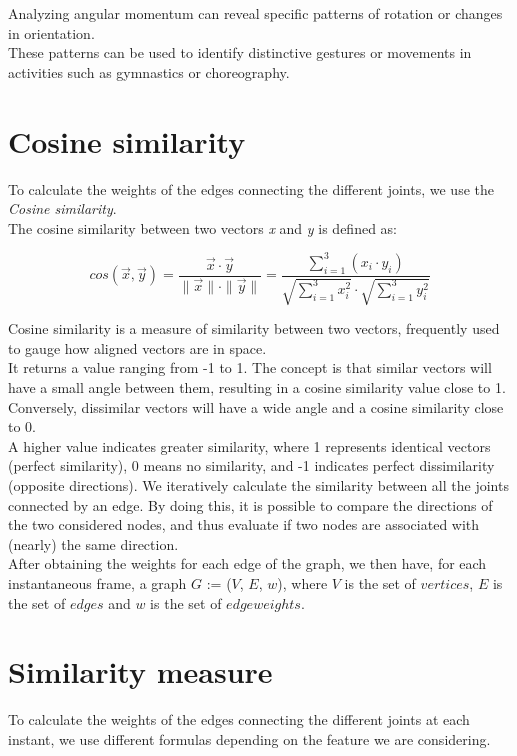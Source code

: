 Analyzing angular momentum can reveal specific patterns of rotation or changes in orientation. \\
These patterns can be used to identify distinctive gestures or movements in activities such as gymnastics or choreography.

\section{Cosine similarity} 
    
To calculate the weights of the edges connecting the different joints, we use the \textit{Cosine similarity}. \\ 
The cosine similarity between two vectors \textit{x} and \textit{y} is defined as: 

\begin{equation}  
  cos(\vec{x}, \vec{y}) = \frac{\vec{x} \cdot \vec{y}}{\|\vec{x}\| \cdot \|\vec{y}\|}  =  \frac{\sum_{i=1}^{3} (x_i \cdot y_i)}{\sqrt{\sum_{i=1}^{3} x_i^2} \cdot \sqrt{\sum_{i=1}^{3} y_i^2}}    
\end{equation} 

Cosine similarity is a measure of similarity between two vectors, frequently used to gauge how aligned vectors are in space. \\ 
It returns a value ranging from -1 to 1. 
The concept is that similar vectors will have a small angle between them, resulting in a cosine similarity value close to 1. \\ 
Conversely, dissimilar vectors will have a wide angle and a cosine similarity close to 0.\\ 
A higher value indicates greater similarity, where 1 represents identical vectors (perfect similarity), 0 means no similarity, and -1 indicates perfect dissimilarity (opposite directions). 
We iteratively calculate the similarity between all the joints connected by an edge. 
By doing this, it is possible to compare the directions of the two considered nodes, and thus evaluate if two nodes are associated with (nearly) the same direction. \\ 
After obtaining the weights for each edge of the graph, we then have, for each instantaneous frame, a graph $G$ := ($V$, $E$, $w$), where   
$V$ is the set of $vertices$, $E$ is the set of $edges$ and $w$ is the set of $edge weights$.

\section{Similarity measure}
To calculate the weights of the edges connecting the different joints at each instant, we use different formulas depending on the feature we are considering.
\\

